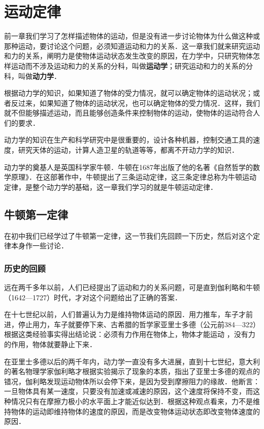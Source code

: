 

\chapter{运动定律}



前一章我们学习了怎样描述物体的运动，但是没有进一步讨论物体为什么做这种或那种运动，要讨论这个问题，必须知道运动和力的关系．这一章我们就来研究运动和力的关系，阐明力是使物体运动状态发生改变的原因，在力学中，只研究物体怎样运动而不涉及运动和力的关系的分科，叫做\textbf{运动学}；研究运动和力的关系的分科，叫做\textbf{动力学}．

根据动力学的知识，如果知道了物体的受力情况，就可以确定物体的运动状况；或者反过来，如果知道了物体的运动状况，也可以确定物体的受力情况．这样，我们就不但能够描述运动，而且能够创造条件来控制物体的运动，使物体的运动符合人们的要求．

动力学的知识在生产和科学研究中是很重要的，设计各种机器，控制交通工具的速度，研究天体的运动，计算人造卫星的轨道等等，都离不开动力学的知识．

动力学的奠基人是英国科学家牛顿．牛顿在1687年出版了他的名著《自然哲学的数学原理》．在这部著作中，牛顿提出了三条运动定律，这三条定律总称为牛顿运动定律，是整个动力学的基础，这一章我们学习的就是牛顿运动定律．

\section{牛顿第一定律}
在初中我们已经学过了牛顿第一定律，这一节我们先回顾一下历史，然后对这个定律本身作一些讨论．

\subsection{历史的回顾} 
远在两千多年以前，人们已经提出了运动和力的关系问题，可是直到伽利略和牛顿（1642—1727）时代，才对这个问题给出了正确的答案．

在十七世纪以前，人们普遍认为力是维持物体运动的原因．用力推车，车子才前进，停止用力，车子就要停下来、古希腊的哲学家亚里士多德（公元前384—322）根据这类经验事实得出结论说：必须有力作用在物体上，物体才能运动
，没有力的作用，物体就要静止下来．

在亚里士多德以后的两千年内，动力学一直没有多大进展，直到十七世纪，意大利的著名物理学家伽利略才根据实验揭示了现象的本质，指出了亚里士多德的观点的错况，伽利略发现运动物体所以会停下来，是因为受到摩擦阻力的缘故．他断言：一旦物体具有某一速度，只要没有加速或减速的原因，这个速度将保持不变，而这种情况只有在摩擦力极小的水平面上才能近似达到．根据这种观点看来，力不是维持物体的运动即维持物体的速度的原因，而是改变物体运动状态即改变物体速度的原因．

